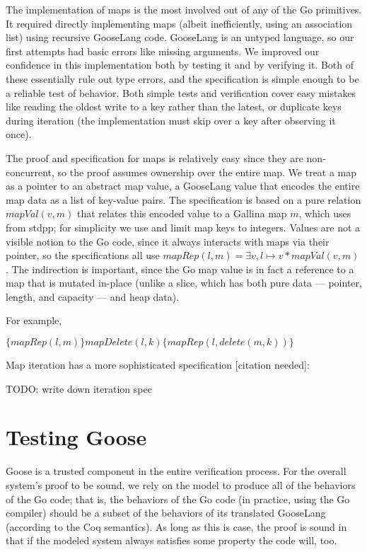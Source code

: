 The implementation of maps is the most involved out of any of the Go
primitives. It required directly implementing maps (albeit
inefficiently, using an association list) using recursive GooseLang
code. GooseLang is an untyped language, so our first attempts had basic
errors like missing arguments. We improved our confidence in this
implementation both by testing it and by verifying it. Both of these
essentially rule out type errors, and the specification is simple enough
to be a reliable test of behavior. Both simple tests and verification
cover easy mistakes like reading the oldest write to a key rather than
the latest, or duplicate keys during iteration (the implementation must
skip over a key after observing it once).

The proof and specification for maps is relatively easy since they are
non-concurrent, so the proof assumes ownership over the entire map. We
treat a map as a pointer to an abstract map value, a GooseLang value
that encodes the entire map data as a list of key-value pairs. The
specification is based on a pure relation \(mapVal(v, m)\) that relates
this encoded value to a Gallina map \(m\), which uses  from
stdpp; for simplicity we use  and limit map
keys to integers. Values are not a visible notion to the Go code, since
it always interacts with maps via their pointer, so the specifications
all use \(mapRep(l, m) = \exists v, l \mapsto v * mapVal(v, m)\). The
indirection is important, since the Go map value
 is in fact a reference to a map that is
mutated in-place (unlike a slice, which has both pure data --- pointer,
length, and capacity --- and heap data).

For example,

\(\{mapRep(l, m)\} mapDelete(l, k) \{mapRep(l, delete(m, k))\}\)

Map iteration has a more sophisticated specification {[}citation
needed{]}:

TODO: write down iteration spec

\section{Testing Goose}

Goose is a trusted component in the entire verification process. For the
overall system's proof to be sound, we rely on the model to produce all
of the behaviors of the Go code; that is, the behaviors of the Go code
(in practice, using the Go compiler) should be a subset of the behaviors
of its translated GooseLang (according to the Coq semantics). As long as
this is case, the proof is sound in that if the modeled system always
satisfies some property the code will, too.

